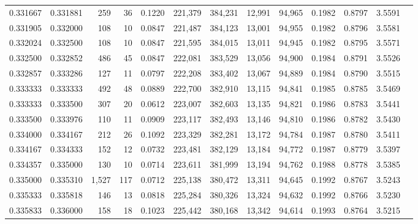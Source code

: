 \begin{tabular}{rrrrrrrrrrrrr}
0.331667 & 0.331881 &   259 &  36 &                                     0.1220 & 221,379 & 384,231 &  12,991 &  94,965 & 0.1982 & 0.8797 & 3.5591 \\
0.331905 & 0.332000 &   108 &  10 &                                     0.0847 & 221,487 & 384,123 &  13,001 &  94,955 & 0.1982 & 0.8796 & 3.5581 \\
0.332024 & 0.332500 &   108 &  10 &                                     0.0847 & 221,595 & 384,015 &  13,011 &  94,945 & 0.1982 & 0.8795 & 3.5571 \\
0.332500 & 0.332852 &   486 &  45 &                                     0.0847 & 222,081 & 383,529 &  13,056 &  94,900 & 0.1984 & 0.8791 & 3.5526 \\
0.332857 & 0.333286 &   127 &  11 &                                     0.0797 & 222,208 & 383,402 &  13,067 &  94,889 & 0.1984 & 0.8790 & 3.5515 \\
0.333333 & 0.333333 &   492 &  48 &                                     0.0889 & 222,700 & 382,910 &  13,115 &  94,841 & 0.1985 & 0.8785 & 3.5469 \\
0.333333 & 0.333500 &   307 &  20 &                                     0.0612 & 223,007 & 382,603 &  13,135 &  94,821 & 0.1986 & 0.8783 & 3.5441 \\
0.333500 & 0.333976 &   110 &  11 &                                     0.0909 & 223,117 & 382,493 &  13,146 &  94,810 & 0.1986 & 0.8782 & 3.5430 \\
0.334000 & 0.334167 &   212 &  26 &                                     0.1092 & 223,329 & 382,281 &  13,172 &  94,784 & 0.1987 & 0.8780 & 3.5411 \\
0.334167 & 0.334333 &   152 &  12 &                                     0.0732 & 223,481 & 382,129 &  13,184 &  94,772 & 0.1987 & 0.8779 & 3.5397 \\
0.334357 & 0.335000 &   130 &  10 &                                     0.0714 & 223,611 & 381,999 &  13,194 &  94,762 & 0.1988 & 0.8778 & 3.5385 \\
0.335000 & 0.335310 & 1,527 & 117 &                                     0.0712 & 225,138 & 380,472 &  13,311 &  94,645 & 0.1992 & 0.8767 & 3.5243 \\
0.335333 & 0.335818 &   146 &  13 &                                     0.0818 & 225,284 & 380,326 &  13,324 &  94,632 & 0.1992 & 0.8766 & 3.5230 \\
0.335833 & 0.336000 &   158 &  18 &                                     0.1023 & 225,442 & 380,168 &  13,342 &  94,614 & 0.1993 & 0.8764 & 3.5215 \\

\end{tabular}
